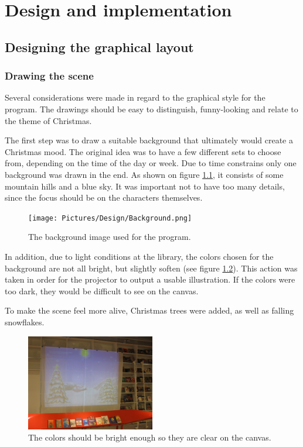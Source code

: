 \chapter{Design and implementation}\label{implementation}
\section{Designing the graphical layout}
\subsection{Drawing the scene}
Several considerations were made in regard to the graphical style for the program. The drawings should be easy to distinguish, funny-looking and relate to the theme of Christmas. 

The first step was to draw a suitable background that ultimately would create a Christmas mood. The original idea was to have a few different sets to choose from, depending on the time of the day or week. Due to time constrains only one background was drawn in the end. As shown on figure \ref{fig:ip_Background}, it consists of some mountain hills and a blue sky. It was important not to have too many details, since the focus should be on the characters themselves.

\begin{figure}[htbp]
\centering
\texttt{[image: Pictures/Design/Background.png]}
\caption{The background image used for the program.}
\label{fig:ip_Background}
\end{figure}

In addition, due to light conditions at the library, the colors chosen for the background are not all bright, but slightly soften (see figure \ref{fig:background_projector}). This action was taken in order for the projector to output a usable illustration. If the colors were too dark, they would be difficult to see on the canvas.

To make the scene feel more alive, Christmas trees were added, as well as falling snowflakes.

\begin{figure}[htbp]
\centering
\includegraphics[width=0.50\textwidth]{Pictures/Design/background_projector}
\caption{The colors should be bright enough so they are clear on the canvas.}
\label{fig:background_projector}
\end{figure}

